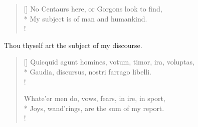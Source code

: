 {\begin{verse}[\versewidth]
No Centaurs here, or Gorgons look to find,\\*
My subject is of man and humankind.\\!
\end{verse}
Thou thyself art the subject of my discourse.
\settowidth{\versewidth}{Quicquid agunt homines, votum, timor, ira, voluptas,}
\begin{verse}[\versewidth]
\textlatin{Quicquid agunt homines, votum, timor, ira, voluptas,}\\*
\textlatin{Gaudia, discursus, nostri farrago libelli.}\\!

Whate'er men do, vows, fears, in ire, in sport,\\*
Joys, wand'rings, are the sum of my report.\\!
\end{verse}

}
